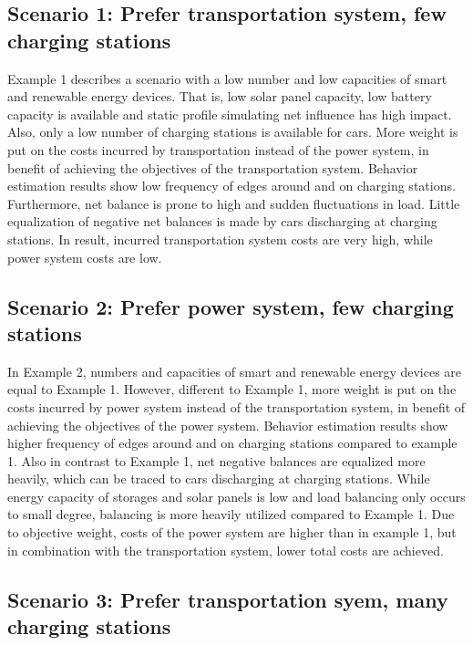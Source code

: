 \subsection*{Scenario 1: Prefer transportation system, few charging stations}
Example 1 describes a scenario with a low number and low capacities of smart and renewable energy devices. That is, low solar panel capacity, low battery capacity is available and static profile simulating net influence has high impact. Also, only a low number of charging stations is available for cars. More weight is put on the costs incurred by transportation instead of the power system, in benefit of achieving the objectives of the transportation system. Behavior estimation results show low frequency of edges around and on charging stations. Furthermore, net balance is prone to high and sudden fluctuations in load. Little equalization of negative net balances is made by cars discharging at charging stations. In result, incurred transportation system costs are very high, while power system costs are low.

\subsection*{Scenario 2: Prefer power system, few charging stations}

In Example 2, numbers and capacities of smart and renewable energy devices are equal to Example 1. However, different to Example 1, more weight is put on the costs incurred by power system instead of the transportation system, in benefit of achieving the objectives of the power system. Behavior estimation results show higher frequency of edges around and on charging stations compared to example 1. Also in contrast to Example 1, net negative balances are equalized more heavily, which can be traced to cars discharging at charging stations. While energy capacity of storages and solar panels is low and load balancing only occurs to small degree, balancing is more heavily utilized compared to Example 1. Due to objective weight, costs of the power system are higher than in example 1, but in combination with the transportation system, lower total costs are achieved.

\subsection*{Scenario 3: Prefer transportation syem, many charging stations}

